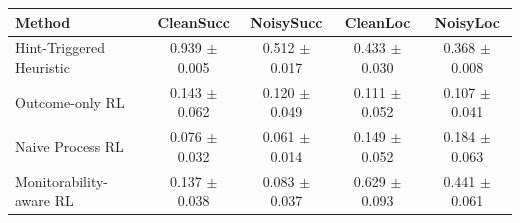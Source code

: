 \begin{tabular}{lcccc}
\toprule
Method & CleanSucc & NoisySucc & CleanLoc & NoisyLoc \\
\midrule
Hint-Triggered Heuristic & 0.939 $\pm$ 0.005 & 0.512 $\pm$ 0.017 & 0.433 $\pm$ 0.030 & 0.368 $\pm$ 0.008 \\
Outcome-only RL & 0.143 $\pm$ 0.062 & 0.120 $\pm$ 0.049 & 0.111 $\pm$ 0.052 & 0.107 $\pm$ 0.041 \\
Naive Process RL & 0.076 $\pm$ 0.032 & 0.061 $\pm$ 0.014 & 0.149 $\pm$ 0.052 & 0.184 $\pm$ 0.063 \\
Monitorability-aware RL & 0.137 $\pm$ 0.038 & 0.083 $\pm$ 0.037 & 0.629 $\pm$ 0.093 & 0.441 $\pm$ 0.061 \\
\bottomrule
\end{tabular}